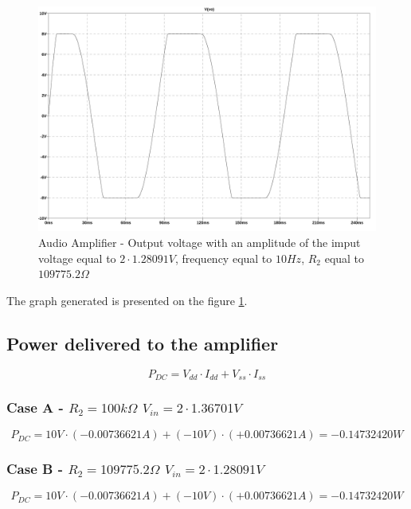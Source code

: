 \documentclass[10pt,a4paper]{article}
\begin{document}
\begin{figure}[H]
  \centering
  \includegraphics[width=14cm]{graph/1d5b.jpg}
  \caption{Audio Amplifier - Output voltage with an amplitude of the imput voltage equal to $2 \cdot 1.28091V$, frequency equal to $10Hz$, $R_2$ equal to $109775.2\Omega$}
  \label{1d5bgraph}
\end{figure}

The graph generated is presented on the figure \ref{1d5bgraph}.\\

\subsection{Power delivered to the amplifier}

\begin{equation}
P_{DC} = V_{dd} \cdot I_{dd} + V_{ss} \cdot I_{ss}
\end{equation}

\subsubsection{Case A - $R_2 = 100k\Omega$ $V_{in} = 2 \cdot 1.36701V$}


$$P_{DC} = 10V \cdot (-0.00736621A) + (-10V) \cdot (+0.00736621 A) = -0.14732420W$$

\subsubsection{Case B - $R_2 = 109775.2\Omega$ $V_{in} = 2 \cdot 1.28091V$}


$$P_{DC} = 10V \cdot (-0.00736621A) + (-10V) \cdot (+0.00736621 A) = -0.14732420W$$
\end{document}
